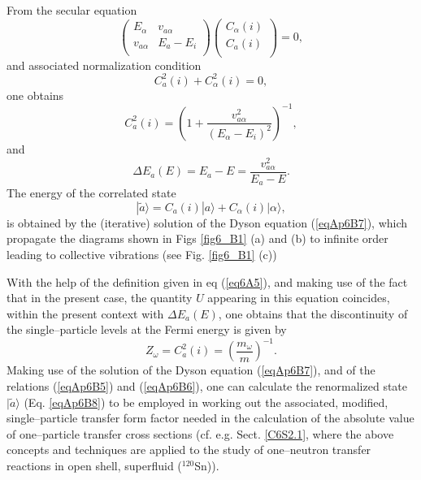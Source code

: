\begin{subappendices}
  From the secular equation
\begin{equation}
\left(
\begin{matrix}
E_\alpha & v_{a\alpha}\\  
v_{a \alpha} & E_a-E_i \\ 
\end{matrix}
\right)
\left(
\begin{matrix}
C_\alpha(i)\\  
C_a(i)\\ 
\end{matrix}
\right)=0,
\end{equation}
and associated normalization condition
\begin{equation}\label{eqAp6B5}
C_a^2(i)+C_\alpha^2(i)=0,
 \end{equation}
one obtains
\begin{equation}\label{eqAp6B6}
C_a^2(i)=\left(1+\frac{v_{a\alpha}^2}{(E_\alpha-E_i)^2}\right)^{-1},
 \end{equation}
and 
\begin{equation}\label{eqAp6B7}
\Delta E_a(E)=E_a-E=\frac{v_{a\alpha}^2}{E_a-E}.
 \end{equation}
The energy of the correlated state
\begin{equation}\label{eqAp6B8}
|\tilde a\rangle=C_a(i)| a\rangle+C_\alpha (i)| \alpha\rangle,
 \end{equation}
is obtained by the (iterative) solution of the Dyson equation (\ref{eqAp6B7}), which propagate the diagrams shown in Figs \ref{fig6_B1} (a) and (b) to infinite order leading to collective vibrations (see Fig. \ref{fig6_B1} (c))

With the help of the definition given in eq (\ref{eq6A5}), and making use of the fact that in the present case, the quantity $U$ appearing in this equation coincides, within the present context with $\Delta E_a(E)$, one obtains that the discontinuity of the single--particle levels at the Fermi energy is given by
\begin{equation}\label{eqAp6B4}
Z_\omega=C_a^2(i)=\left(\frac{m_\omega}{m}\right)^{-1}.
 \end{equation}
 Making use of the solution of  the Dyson equation (\ref{eqAp6B7}), and of the relations (\ref{eqAp6B5}) and (\ref{eqAp6B6}), one can calculate the renormalized state $|\tilde a\rangle$ (Eq. \ref{eqAp6B8}) to be employed in working out the associated, modified, single--particle transfer form factor needed in the calculation of the absolute value of one--particle transfer cross sections (cf. e.g. Sect. \ref{C6S2.1}, where the  above concepts and techniques are applied to the study of one--neutron transfer reactions in open shell, superfluid ($^{120}$Sn)).	 
 

\end{subappendices}
